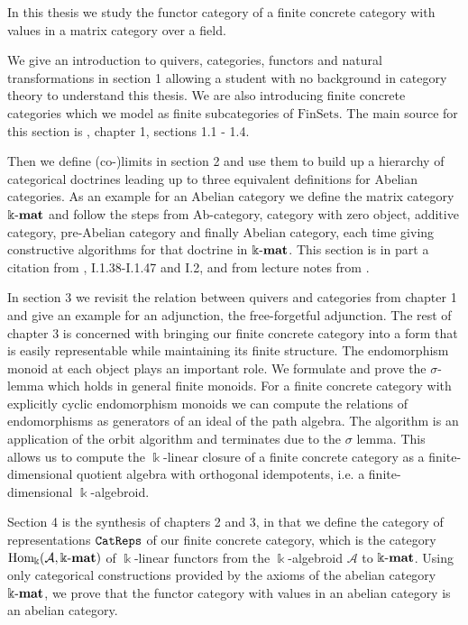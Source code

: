In this thesis we study the functor category of a finite concrete category with values in a matrix category over a field.

We give an introduction to quivers, categories, functors and natural transformations in section 1 allowing a student with
no background in category theory to understand this thesis. We are also introducing finite concrete categories which we
model as finite subcategories of $\mathrm{FinSets}$. The main source for this section is \cite{[context]}, chapter 1, sections 1.1 - 1.4.

Then we define (co-)limits in section 2 and use them to build up a hierarchy of categorical doctrines leading up
to three equivalent definitions for Abelian categories.
As an example for an Abelian category we define the matrix category $\Bbbk\textnormal{-}\mathbf{mat}$
and follow the steps from Ab-category, category with zero object, additive category, pre-Abelian category and
finally Abelian category, each time giving constructive algorithms for that doctrine in $\Bbbk\textnormal{-}\mathbf{mat}$. This section is in part a 
citation from \cite{[Posur]}, I.1.38-I.1.47 and I.2, and from lecture notes from \cite{[AlgAlg]}.

In section 3 we revisit the relation between quivers and categories from chapter 1
and give an example for an adjunction, the free-forgetful adjunction. The rest of chapter 3 is concerned with
bringing our finite concrete category into a form that is easily representable while maintaining its finite structure.
The endomorphism monoid at each object plays an important role. We formulate and prove the $\sigma$-lemma
which holds in general finite monoids. For a finite concrete category with explicitly
cyclic endomorphism monoids we can compute the relations of endomorphisms as generators of an ideal
of the path algebra. The algorithm is an application of the orbit algorithm and terminates due to the $\sigma$ lemma.
This allows us to compute the $\Bbbk$-linear closure of a finite concrete category
as a finite-dimensional quotient algebra with orthogonal idempotents, i.e. a finite-dimensional $\Bbbk$-algebroid.

Section 4 is the synthesis of chapters 2 and 3, in that we define the category of representations $\texttt{CatReps}$
of our finite concrete category, which is the category $\mathrm{Hom_{\Bbbk}}(\mathcal{A},\Bbbk\textnormal{-}\mathbf{mat})$ of $\Bbbk$-linear functors from the $\Bbbk$-algebroid
$\mathcal{A}$ to $\Bbbk\textnormal{-}\mathbf{mat}$. Using only categorical constructions provided by the axioms of the abelian category $\Bbbk\textnormal{-}\mathbf{mat}$, we prove that
the functor category with values in an abelian category is an abelian category.

